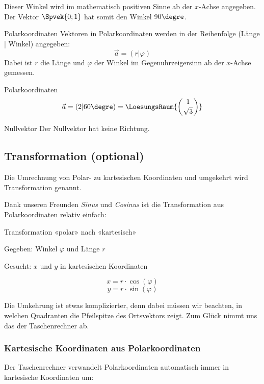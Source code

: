 Dieser Winkel wird im mathematisch positiven Sinne ab der $x$-Achse
angegeben. Der Vektor
$\Spvek{0;1}$ hat somit den Winkel $90\degre$.
  \begin{definition}{Polarkoordinaten}{}
    Vektoren in Polarkoordinaten werden in der Reihenfolge (Länge |
    Winkel) angegeben:
    $$\vec{a} = (r | \varphi)$$
    Dabei ist $r$ die Länge und $\varphi$ der Winkel im
    Gegenuhrzeigersinn ab der $x$-Achse gemessen.
  \end{definition}

  \begin{beispiel}{Polarkoordinaten}{}
    $$\vec{a} = (2 | 60\degre) = \LoesungsRaum{\left(1\atop \sqrt{3}\right)}$$
  \end{beispiel}
  
  \begin{bemerkung}{Nullvektor}{}
    Der Nullvektor hat keine Richtung.
    \end{bemerkung}
  \newpage
  
\subsection{Transformation (optional)}
  Die Umrechnung von Polar- zu kartesischen
  Koordinaten und umgekehrt wird Transformation genannt.
  
  Dank unseren Freunden \textit{Sinus} und \textit{Cosinus} ist die
  Transformation aus Polarkoordinaten relativ einfach:
  \begin{rezept}{Transformation «polar» nach «kartesisch»}{}

    Gegeben:  Winkel $\varphi$ und Länge $r$

    Gesucht: $x$ und $y$ in kartesischen Koordinaten

    $$x = r\cdot{}\cos(\varphi)$$
    $$y = r\cdot{}\sin(\varphi)$$
  \end{rezept}

  Die Umkehrung ist etwas komplizierter, denn dabei müssen wir
  beachten, in welchen Quadranten die Pfeilspitze des Ortsvektors
  zeigt.
  Zum Glück nimmt uns das der Taschenrechner ab.

  \subsubsection{Kartesische Koordinaten aus Polarkoordinaten}
  Der Taschenrechner verwandelt Polarkoordinaten automatisch immer in
  kartesische Koordinaten um:


